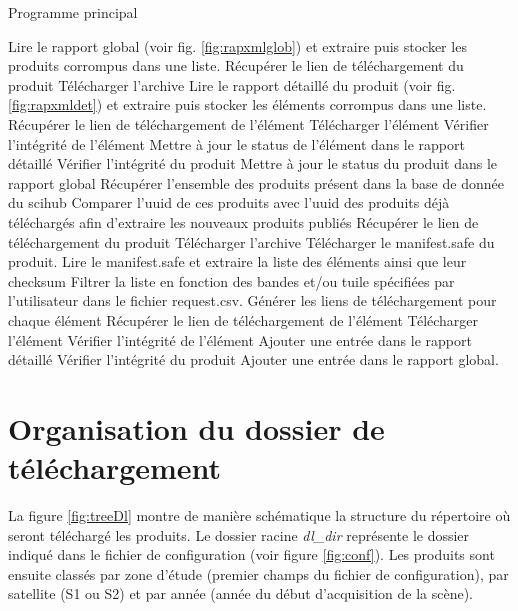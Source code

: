 \documentclass[notitlepage]{report}
\begin{document}
\begin{algorithm}
\caption{Programme principal}\label{alg:main}
\begin{algorithmic}[1]
\State Lire le rapport global (voir fig. \ref{fig:rapxmlglob}) et extraire puis stocker les produits corrompus dans une liste.
			\State Récupérer le lien de téléchargement du produit
			\State Télécharger l'archive
		\Else {}
			\State Lire le rapport détaillé du produit (voir fig. \ref{fig:rapxmldet}) et extraire puis stocker les éléments corrompus dans une liste.
					\State Récupérer le lien de téléchargement de l'élément
					\State Télécharger l'élément
					\State Vérifier l'intégrité de l'élément
					\State Mettre à jour le status de l'élément dans le rapport détaillé
				\EndFor
		\EndIf
		\State Vérifier l'intégrité du produit
		\State Mettre à jour le status du produit dans le rapport global
	\EndFor
	\State Récupérer l'ensemble des produits présent dans la base de donnée du scihub
	\State Comparer l'uuid de ces produits avec l'uuid des produits déjà téléchargés afin d'extraire les nouveaux produits publiés
				\State Récupérer le lien de téléchargement du produit
				\State Télécharger l'archive
			\Else {}
				\State Télécharger le manifest.safe du produit.
				\State Lire le manifest.safe et extraire la liste des éléments ainsi que leur checksum
				\State Filtrer la liste en fonction des bandes et/ou tuile spécifiées par l'utilisateur dans le fichier request.csv.
				\State Générer les liens de téléchargement pour chaque élément
						\State Récupérer le lien de téléchargement de l'élément
						\State Télécharger l'élément
						\State Vérifier l'intégrité de l'élément
						\State Ajouter une entrée dans le rapport détaillé
					\EndFor
			\EndIf
		\State Vérifier l'intégrité du produit
		\State Ajouter une entrée dans le rapport global.
		\EndFor
		
\EndFor
\end{algorithmic}
\end{algorithm}

\section{Organisation du dossier de téléchargement}
La figure \ref{fig:treeDl} montre de manière schématique la structure du répertoire où seront téléchargé les produits. Le dossier racine \emph{dl\_dir} représente le dossier indiqué dans le fichier de configuration (voir figure \ref{fig:conf}). Les produits sont ensuite classés par zone d'étude (premier champs du fichier de configuration), par satellite (S1 ou S2) et par année (année du début d'acquisition de la scène). 
\end{document}
